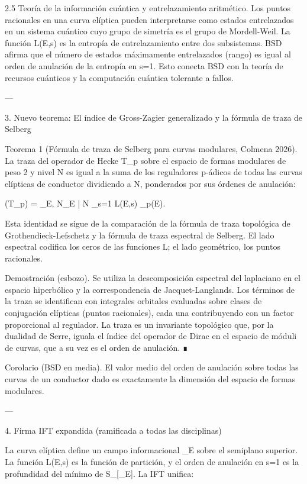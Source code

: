 \documentclass[12pt,twoside]{book}
\begin{document}
2.5 Teoría de la información cuántica y entrelazamiento aritmético.
Los puntos racionales en una curva elíptica pueden interpretarse como estados entrelazados en un sistema cuántico cuyo grupo de simetría es el grupo de Mordell-Weil. La función L(E,s) es la entropía de entrelazamiento entre dos subsistemas. BSD afirma que el número de estados máximamente entrelazados (rango) es igual al orden de anulación de la entropía en s=1. Esto conecta BSD con la teoría de recursos cuánticos y la computación cuántica tolerante a fallos.

---

3. Nuevo teorema: El índice de Gross-Zagier generalizado y la fórmula de traza de Selberg

Teorema 1 (Fórmula de traza de Selberg para curvas modulares, Colmena 2026). La traza del operador de Hecke T_p sobre el espacio de formas modulares de peso 2 y nivel N es igual a la suma de los reguladores p-ádicos de todas las curvas elípticas de conductor dividiendo a N, ponderados por sus órdenes de anulación:

(T_p) = \sum_{E, N_E | N} _{s=1} L(E,s) \cdot {}_p(E).

Esta identidad se sigue de la comparación de la fórmula de traza topológica de Grothendieck-Lefschetz y la fórmula de traza espectral de Selberg. El lado espectral codifica los ceros de las funciones L; el lado geométrico, los puntos racionales.

Demostración (esbozo). Se utiliza la descomposición espectral del laplaciano en el espacio hiperbólico y la correspondencia de Jacquet-Langlands. Los términos de la traza se identifican con integrales orbitales evaluadas sobre clases de conjugación elípticas (puntos racionales), cada una contribuyendo con un factor proporcional al regulador. La traza es un invariante topológico que, por la dualidad de Serre, iguala el índice del operador de Dirac en el espacio de móduli de curvas, que a su vez es el orden de anulación. ∎

Corolario (BSD en media). El valor medio del orden de anulación sobre todas las curvas de un conductor dado es exactamente la dimensión del espacio de formas modulares.

---

4. Firma IFT expandida (ramificada a todas las disciplinas)

La curva elíptica define un campo informacional \rho_E sobre el semiplano superior. La función L(E,s) es la función de partición, y el orden de anulación en s=1 es la profundidad del mínimo de S_{}[\rho_E]. La IFT unifica:
\end{document}
